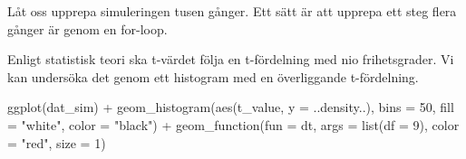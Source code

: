 \documentclass[
]{book}
\newenvironment{Shaded}{\begin{snugshade}}{\end{snugshade}}
\newcommand{\AttributeTok}[1]{\textcolor[rgb]{0.77,0.63,0.00}{#1}}
\newcommand{\ControlFlowTok}[1]{\textcolor[rgb]{0.13,0.29,0.53}{\textbf{#1}}}
\newcommand{\DecValTok}[1]{\textcolor[rgb]{0.00,0.00,0.81}{#1}}
\newcommand{\FunctionTok}[1]{\textcolor[rgb]{0.00,0.00,0.00}{#1}}
\newcommand{\NormalTok}[1]{#1}
\newcommand{\OtherTok}[1]{\textcolor[rgb]{0.56,0.35,0.01}{#1}}
\newcommand{\SpecialCharTok}[1]{\textcolor[rgb]{0.00,0.00,0.00}{#1}}
\newcommand{\StringTok}[1]{\textcolor[rgb]{0.31,0.60,0.02}{#1}}
\theoremstyle{definition}
\theoremstyle{definition}
\theoremstyle{definition}
\theoremstyle{definition}
\theoremstyle{remark}
\begin{document}
Låt oss upprepa simuleringen tusen gånger. Ett sätt är att upprepa ett steg flera gånger är genom en for-loop.

\begin{Shaded}
\end{Shaded}

Enligt statistisk teori ska t-värdet följa en t-fördelning med nio frihetsgrader. Vi kan undersöka det genom ett histogram med en överliggande t-fördelning.

\begin{Shaded}
\begin{Highlighting}[]
\FunctionTok{ggplot}\NormalTok{(dat\_sim) }\SpecialCharTok{+}
  \FunctionTok{geom\_histogram}\NormalTok{(}\FunctionTok{aes}\NormalTok{(t\_value, }\AttributeTok{y =}\NormalTok{ ..density..), }\AttributeTok{bins =} \DecValTok{50}\NormalTok{, }\AttributeTok{fill =} \StringTok{"white"}\NormalTok{, }\AttributeTok{color =} \StringTok{"black"}\NormalTok{) }\SpecialCharTok{+}
  \FunctionTok{geom\_function}\NormalTok{(}\AttributeTok{fun =}\NormalTok{ dt, }\AttributeTok{args =} \FunctionTok{list}\NormalTok{(}\AttributeTok{df =} \DecValTok{9}\NormalTok{), }\AttributeTok{color =} \StringTok{"red"}\NormalTok{, }\AttributeTok{size =} \DecValTok{1}\NormalTok{)}
\end{Highlighting}
\end{Shaded}
\end{document}
